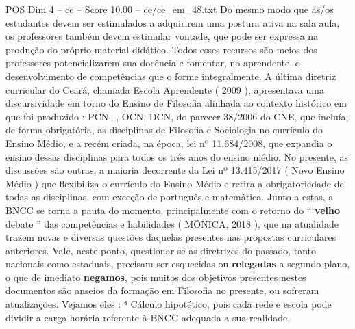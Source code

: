 \begin{textsample}{POS Dim 4 – ce – Score 10.00 – ce/ce\_em\_48.txt}
Do mesmo modo que as/os estudantes devem ser estimulados a adquirirem uma postura ativa na sala aula, os professores também devem estimular vontade, que pode ser expressa na produção do próprio material didático.
Todos esses recursos são meios dos professores potencializarem sua docência e fomentar, no aprendente, o desenvolvimento de competências que o forme integralmente.
A última diretriz curricular do Ceará, chamada Escola Aprendente ( 2009 ), apresentava uma discursividade em torno do Ensino de Filosofia alinhada ao contexto histórico em que foi produzido : PCN+, OCN, DCN, do parecer 38/2006 do CNE, que incluía, de forma obrigatória, as disciplinas de Filosofia e Sociologia no currículo do Ensino Médio, e a recém criada, na época, lei nº 11.684/2008, que expandia o ensino dessas disciplinas para todos os três anos do ensino médio.
No presente, as discussões são outras, a maioria decorrente da Lei nº 13.415/2017 ( Novo Ensino Médio ) que flexibiliza o currículo do Ensino Médio e retira a obrigatoriedade de todas as disciplinas, com exceção de português e matemática.
Junto a estas, a BNCC se torna a pauta do momento, principalmente com o retorno do “ \textbf{velho} debate ” das competências e habilidades ( MÔNICA, 2018 ), que na atualidade trazem novas e diversas questões daquelas presentes nas propostas curriculares anteriores.
Vale, neste ponto, questionar se as diretrizes do passado, tanto nacionais como estaduais, precisam ser esquecidas ou \textbf{relegadas} a segundo plano, o que de imediato \textbf{negamos}, pois muitos dos objetivos presentes nestes documentos são anseios da formação em Filosofia no presente, ou sofreram atualizações.
Vejamos eles : ⁴ Cálculo hipotético, pois cada rede e escola pode dividir a carga horária referente à BNCC adequada a sua realidade.

\end{textsample}

